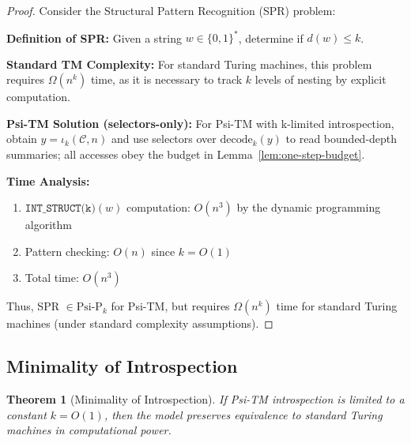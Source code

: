 \documentclass[11pt]{article}
\newtheorem{theorem}{Theorem}
\begin{document}
\begin{proof}
Consider the Structural Pattern Recognition (SPR) problem:

\textbf{Definition of SPR:} 
Given a string $w \in \{0,1\}^*$, determine if $d(w) \leq k$.

\textbf{Standard TM Complexity:}
For standard Turing machines, this problem requires $\Omega(n^k)$ time, as it is necessary to track $k$ levels of nesting by explicit computation.

\textbf{Psi-TM Solution (selectors-only):}
For Psi-TM with k-limited introspection, obtain $y=\iota_k(\mathcal{C},n)$ and use selectors over $\mathrm{decode}_k(y)$ to read bounded-depth summaries; all accesses obey the budget in Lemma~\ref{lem:one-step-budget}.

\textbf{Time Analysis:}
\begin{enumerate}
\item $\texttt{INT\_STRUCT(k)}(w)$ computation: $O(n^3)$ by the dynamic programming algorithm
\item Pattern checking: $O(n)$ since $k = O(1)$
\item Total time: $O(n^3)$
\end{enumerate}

Thus, SPR $\in \text{Psi-P}_k$ for Psi-TM, but requires $\Omega(n^k)$ time for standard Turing machines (under standard complexity assumptions).
\end{proof}

\subsection{Minimality of Introspection}

\begin{theorem}[Minimality of Introspection]
If Psi-TM introspection is limited to a constant $k = O(1)$, then the model preserves equivalence to standard Turing machines in computational power.
\end{theorem}
\end{document}
